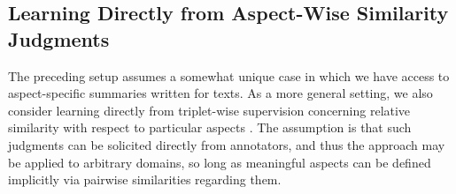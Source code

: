 \documentclass[11pt,a4paper]{article}
\begin{document}

\subsection{Learning Directly from Aspect-Wise Similarity Judgments}
The preceding setup assumes a somewhat unique case in which we have access to aspect-specific summaries written for texts. As a more general setting, we also consider learning directly from triplet-wise supervision concerning relative similarity with respect to particular aspects \cite{amid2015multiview,veit2017conditional,wilber2014cost}. The assumption is that such judgments can be solicited directly from annotators, and thus the approach may be applied to arbitrary domains, so long as meaningful aspects can be defined implicitly via pairwise similarities regarding them. 
\end{document}

